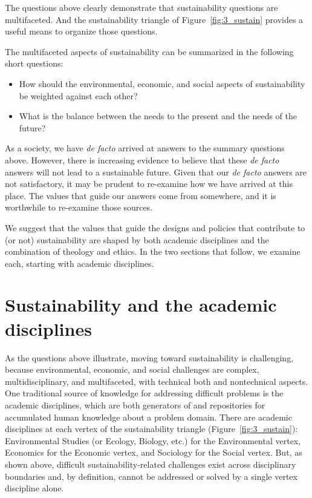 \documentclass[12pt]{article}
\begin{document}
The questions above clearly demonstrate that sustainability questions are multifaceted.
And the sustainability triangle of Figure~\ref{fig:3_sustain} provides a useful means to organize those questions.

The multifaceted aspects of sustainability can be summarized in the following short questions:
%
\begin{itemize}

  \item How should the environmental, economic, and social aspects of sustainability be weighted against each other?
  
  \item What is the balance between the needs to the present and the needs of the future?	

\end{itemize}
%
As a society, we have \emph{de facto} arrived at answers to the summary questions above. 
However, there is increasing evidence to believe that these \emph{de facto}
answers will not lead to a sustainable future.
Given that our \emph{de facto} answers are not satisfactory, 
it may be prudent to re-examine how we have arrived at this place.
The values that guide our answers come from somewhere, and 
it is worthwhile to re-examine those sources.

We suggest that the values that guide the designs and policies that contribute to (or not) sustainability
are shaped by both academic disciplines and the combination of theology and ethics. 
In the two sections that follow, we examine each, 
starting with academic disciplines.


\section{Sustainability and the academic disciplines}
\label{sec:sustainability_and_the_academic_disciplines}

As the questions above illustrate, 
moving toward sustainability is challenging, 
because environmental, economic, and social challenges  
are complex, multidisciplinary, and multifaceted, with 
technical both and nontechnical aspects.
One traditional source of knowledge for addressing difficult problems is
the academic disciplines, 
which are both generators of and repositories for accumulated human knowledge
about a problem domain.
There are academic disciplines 
at each vertex of the sustainability triangle (Figure~\ref{fig:3_sustain}):
Environmental Studies (or Ecology, Biology, etc.) for the Environmental vertex, 
Economics for the Economic vertex, and 
Sociology for the Social vertex.
But, as shown above, difficult sustainability-related 
challenges exist across disciplinary boundaries and, by definition,
cannot be addressed or solved by a single vertex discipline alone.
\end{document}
